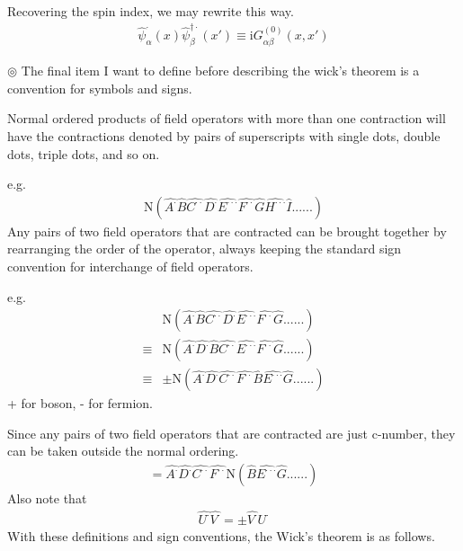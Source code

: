 Recovering the spin index, we may rewrite this way.
\begin{align}\label{2.4.6}
\hat \psi^{\cdot}_{\alpha}(x)\hat \psi^{\dagger\cdot}_{\beta}(x')\equiv \mathrm{i}G_{\alpha\beta}^{(0)}(x,x')
\end{align}

$\circledcirc$ The final item I want to define before describing the wick's theorem is a convention for symbols and signs.

Normal ordered products of field operators with more than one contraction will have the contractions denoted by pairs of superscripts with single dots, double dots, triple dots, and so on.

e.g.
\begin{align}
\mathrm{N}(\hat{A^{\cdot}}\hat{B}\hat{C^{\cdot\cdot}}\hat{D^{\cdot}}\hat{E^{\cdot\cdot\cdot}}\hat{F^{\cdot\cdot}}\hat{G}\hat{H^{\cdot\cdot\cdot}}\hat{I}......)\nonumber
\end{align}
Any pairs of two field operators that are contracted can be brought together by rearranging the order of the operator, always keeping the standard sign convention for interchange of field operators.

e.g.
\begin{align}
&\mathrm{N}(\hat{A^{\cdot}}\hat{B}\hat{C^{\cdot\cdot}}\hat{D^{\cdot}}\hat{E^{\cdot\cdot\cdot}}\hat{F^{\cdot\cdot}}\hat{G}......)\nonumber \\
\equiv&\mathrm{N}(\hat{A^{\cdot}}\hat{D^{\cdot}}\hat{B}\hat{C^{\cdot\cdot}}\hat{E^{\cdot\cdot\cdot}}\hat{F^{\cdot\cdot}}\hat{G}......)\nonumber \\
\equiv&\pm\mathrm{N}(\hat{A^{\cdot}}\hat{D^{\cdot}}\hat{C^{\cdot\cdot}}\hat{F^{\cdot\cdot}}\hat{B}\hat{E^{\cdot\cdot\cdot}}\hat{G}......)\nonumber 
\end{align}
+ for boson, - for fermion.

Since any pairs of two field operators that are contracted are just c-number, they can be taken outside the normal ordering.
\begin{align}
=\hat{A^{\cdot}}\hat{D^{\cdot}}\hat{C^{\cdot\cdot}}\hat{F^{\cdot\cdot}}\mathrm{N}(\hat{B}\hat{E^{\cdot\cdot\cdot}}\hat{G}......)\nonumber 
\end{align}
Also note that
\begin{align}
\hat{U^{\cdot}}\hat{V^{\cdot}}=\pm\hat{V^{\cdot}}\hat{U^{\cdot}} \nonumber
\end{align}
With these definitions and sign conventions, the Wick's theorem is as follows.


